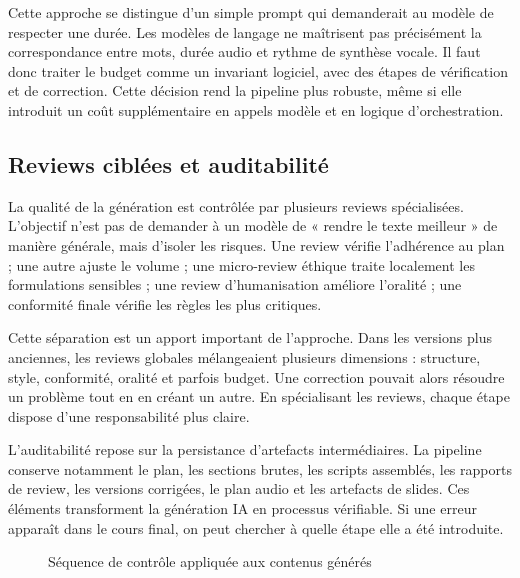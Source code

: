 Cette approche se distingue d'un simple prompt qui demanderait au modèle de respecter
une durée. Les modèles de langage ne maîtrisent pas précisément la correspondance entre
mots, durée audio et rythme de synthèse vocale. Il faut donc traiter le budget comme un
invariant logiciel, avec des étapes de vérification et de correction. Cette décision rend la
pipeline plus robuste, même si elle introduit un coût supplémentaire en appels modèle et
en logique d'orchestration.

\subsection{Reviews ciblées et auditabilité}

La qualité de la génération est contrôlée par plusieurs reviews spécialisées. L'objectif
n'est pas de demander à un modèle de « rendre le texte meilleur » de manière générale,
mais d'isoler les risques. Une review vérifie l'adhérence au plan ; une autre ajuste le
volume ; une micro-review éthique traite localement les formulations sensibles ; une
review d'humanisation améliore l'oralité ; une conformité finale vérifie les règles les plus
critiques.

Cette séparation est un apport important de l'approche. Dans les versions plus anciennes,
les reviews globales mélangeaient plusieurs dimensions : structure, style, conformité,
oralité et parfois budget. Une correction pouvait alors résoudre un problème tout en en
créant un autre. En spécialisant les reviews, chaque étape dispose d'une responsabilité
plus claire.

L'auditabilité repose sur la persistance d'artefacts intermédiaires. La pipeline conserve
notamment le plan, les sections brutes, les scripts assemblés, les rapports de review, les
versions corrigées, le plan audio et les artefacts de slides. Ces éléments transforment la
génération IA en processus vérifiable. Si une erreur apparaît dans le cours final, on peut
chercher à quelle étape elle a été introduite.

\begin{figure}[h]
\centering
{}
\caption{Séquence de contrôle appliquée aux contenus générés}
\end{figure}

